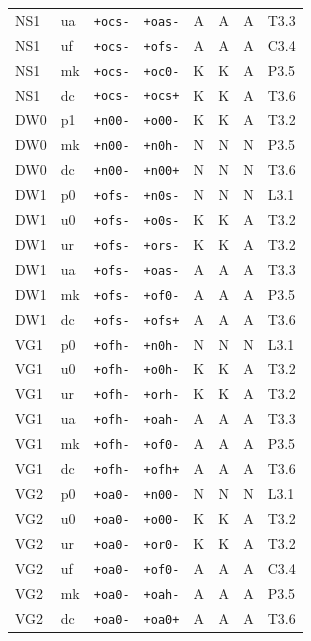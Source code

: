 {\begin{longtable}{@{}llllcccl@{}}
NS1 & ua & \texttt{+ocs-} & \texttt{+oas-} & A & A & A & T3.3 \\
NS1 & uf & \texttt{+ocs-} & \texttt{+ofs-} & A & A & A & C3.4 \\
NS1 & mk & \texttt{+ocs-} & \texttt{+oc0-} & K & K & A & P3.5 \\
NS1 & dc & \texttt{+ocs-} & \texttt{+ocs+} & K & K & A & T3.6 \\
DW0 & p1 & \texttt{+n00-} & \texttt{+o00-} & K & K & A & T3.2 \\
DW0 & mk & \texttt{+n00-} & \texttt{+n0h-} & N & N & N & P3.5 \\
DW0 & dc & \texttt{+n00-} & \texttt{+n00+} & N & N & N & T3.6 \\
DW1 & p0 & \texttt{+ofs-} & \texttt{+n0s-} & N & N & N & L3.1 \\
DW1 & u0 & \texttt{+ofs-} & \texttt{+o0s-} & K & K & A & T3.2 \\
DW1 & ur & \texttt{+ofs-} & \texttt{+ors-} & K & K & A & T3.2 \\
DW1 & ua & \texttt{+ofs-} & \texttt{+oas-} & A & A & A & T3.3 \\
DW1 & mk & \texttt{+ofs-} & \texttt{+of0-} & A & A & A & P3.5 \\
DW1 & dc & \texttt{+ofs-} & \texttt{+ofs+} & A & A & A & T3.6 \\
VG1 & p0 & \texttt{+ofh-} & \texttt{+n0h-} & N & N & N & L3.1 \\
VG1 & u0 & \texttt{+ofh-} & \texttt{+o0h-} & K & K & A & T3.2 \\
VG1 & ur & \texttt{+ofh-} & \texttt{+orh-} & K & K & A & T3.2 \\
VG1 & ua & \texttt{+ofh-} & \texttt{+oah-} & A & A & A & T3.3 \\
VG1 & mk & \texttt{+ofh-} & \texttt{+of0-} & A & A & A & P3.5 \\
VG1 & dc & \texttt{+ofh-} & \texttt{+ofh+} & A & A & A & T3.6 \\
VG2 & p0 & \texttt{+oa0-} & \texttt{+n00-} & N & N & N & L3.1 \\
VG2 & u0 & \texttt{+oa0-} & \texttt{+o00-} & K & K & A & T3.2 \\
VG2 & ur & \texttt{+oa0-} & \texttt{+or0-} & K & K & A & T3.2 \\
VG2 & uf & \texttt{+oa0-} & \texttt{+of0-} & A & A & A & C3.4 \\
VG2 & mk & \texttt{+oa0-} & \texttt{+oah-} & A & A & A & P3.5 \\
VG2 & dc & \texttt{+oa0-} & \texttt{+oa0+} & A & A & A & T3.6 \\

\end{longtable}}
